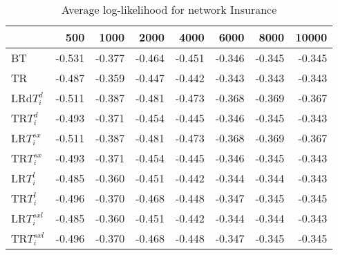 \begin{table}
 \begin{center}
 \begin{tabular}{lrrrrrrr}
& 500 &  1000 & 2000 & 4000 & 6000& 8000&  10000\\\hline
BT & -0.531 & -0.377 & -0.464 & -0.451 & -0.346 & -0.345 & -0.345\\\hline
TR & -0.487 & -0.359 & -0.447 & -0.442 & -0.343 & -0.343 & -0.343\\\hline
LRd$T_i^d$ & -0.511 & -0.387 & -0.481 & -0.473 & -0.368 & -0.369 & -0.367\\\hline
TR$T_i^d$ & -0.493 & -0.371 & -0.454 & -0.445 & -0.346 & -0.345 & -0.343\\\hline
LR$T_i^{sx}$ & -0.511 & -0.387 & -0.481 & -0.473 & -0.368 & -0.369 & -0.367\\\hline
TR$T_i^{sx}$ & -0.493 & -0.371 & -0.454 & -0.445 & -0.346 & -0.345 & -0.343\\\hline
LR$T_i^l$ & -0.485 & -0.360 & -0.451 & -0.442 & -0.344 & -0.344 & -0.343\\\hline
TR$T_i^l$ & -0.496 & -0.370 & -0.468 & -0.448 & -0.347 & -0.345 & -0.345\\\hline
LR$T_i^{sxl}$ & -0.485 & -0.360 & -0.451 & -0.442 & -0.344 & -0.344 & -0.343\\\hline
TR$T_i^{sxl}$ & -0.496 & -0.370 & -0.468 & -0.448 & -0.347 & -0.345 & -0.345\\\hline
\end{tabular}
\end{center}
\caption{Average log-likelihood for network Insurance }
\label{Insurancell}
\end{table}



